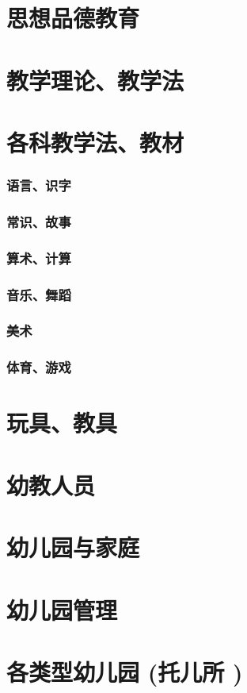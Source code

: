\documentclass[UTF8]{../../ApplicationUniverse}
\begin{document}
\section{思想品德教育}
\section{教学理论、教学法}
\section{各科教学法、教材}
    \subsubsection{语言、识字}
    \subsubsection{常识、故事}
    \subsubsection{算术、计算}
    \subsubsection{音乐、舞蹈}
    \subsubsection{美术}
    \subsubsection{体育、游戏}
\section{玩具、教具}
\section{幼教人员}
\section{幼儿园与家庭}
\section{幼儿园管理}
\section{各类型幼儿园 (托儿所 )}
\end{document}
